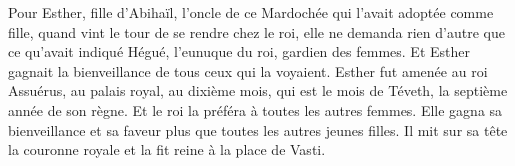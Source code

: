 Pour Esther, fille d’Abihaïl, l’oncle de ce Mardochée qui l’avait adoptée comme fille,
	quand vint le tour de se rendre chez le roi,
	elle ne demanda rien d’autre que ce qu’avait indiqué Hégué,
		l’eunuque du roi, gardien des femmes.
Et Esther gagnait la bienveillance de tous ceux qui la voyaient.
Esther fut amenée au roi Assuérus, au palais royal,
	au dixième mois, qui est le mois de Téveth, la septième année de son règne.
	Et le roi la préféra à toutes les autres femmes.
Elle gagna sa bienveillance et sa faveur plus que toutes les autres jeunes filles.
	Il mit sur sa tête la couronne royale et la fit reine à la place de Vasti.
